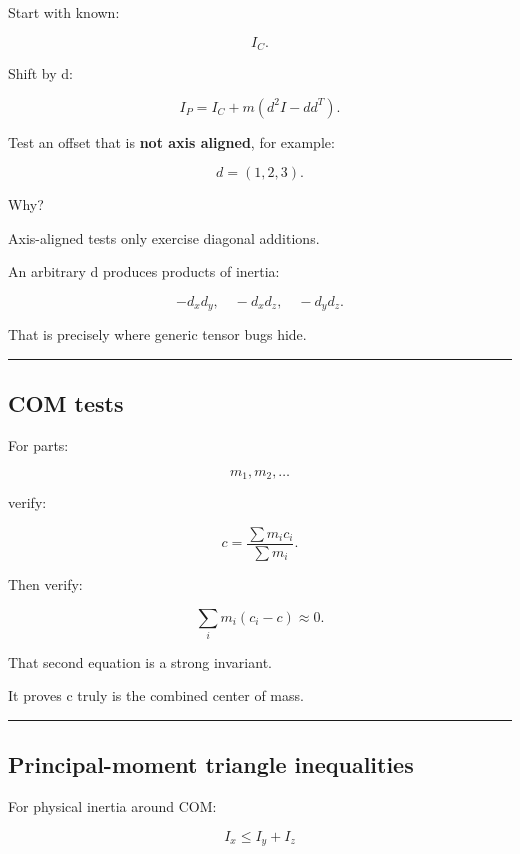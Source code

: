 Start with known:

\[
I_C.
\]

Shift by d:

\[
I_P
=
I_C+
m(d^2I-dd^T).
\]

Test an offset that is \textbf{not axis aligned}, for example:

\[
d=(1,2,3).
\]

Why?

Axis-aligned tests only exercise diagonal additions.

An arbitrary d produces products of inertia:

\[
-d_xd_y,
\quad
-d_xd_z,
\quad
-d_yd_z.
\]

That is precisely where generic tensor bugs hide.

\begin{center}\rule{0.5\linewidth}{0.5pt}\end{center}

\subsection{COM tests}\label{06-engine-ii-ch039-com-tests}

\hypertarget{06-engine-ii-ch039-com-tests}{}

For parts:

\[
m_1,m_2,\ldots
\]

verify:

\[
c
=
\frac{\sum m_ic_i}{\sum m_i}.
\]

Then verify:

\[
\sum_i
m_i(c_i-c)
\approx0.
\]

That second equation is a strong invariant.

It proves c truly is the combined center of mass.

\begin{center}\rule{0.5\linewidth}{0.5pt}\end{center}

\subsection{Principal-moment triangle inequalities}\label{06-engine-ii-ch039-principal-moment-triangle-inequalities}

\hypertarget{06-engine-ii-ch039-principal-moment-triangle-inequalities}{}

For physical inertia around COM:

\[
I_x\le I_y+I_z
\]

